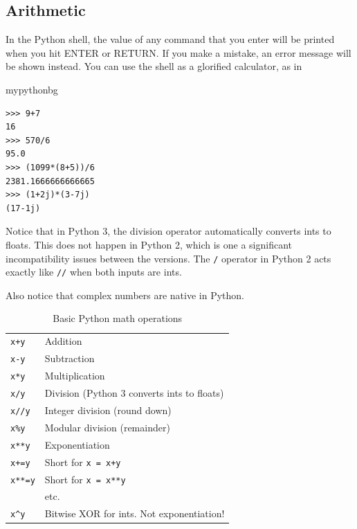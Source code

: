 \subsection{Arithmetic}

In the Python shell, the value of any command
that you enter will be printed when you hit ENTER or RETURN.
If you make a mistake, an error message will be shown instead.
You can use the shell as a glorified calculator, as in
\begin{tsession}{mypythonbg}
\begin{verbatim}
>>> 9+7
16
>>> 570/6
95.0
>>> (1099*(8+5))/6
2381.1666666666665
>>> (1+2j)*(3-7j)
(17-1j)
\end{verbatim}
\end{tsession}
Notice that in Python 3, the division operator automatically converts ints to floats.
This does not happen in Python 2,
which is one a significant incompatibility issues between the versions.
The \texttt{/} operator in Python 2 acts exactly like \texttt{//} when both inputs are ints.

Also notice that complex numbers are native in Python.

\begin{table}
\centering
\begin{tabular}{l|l}
\texttt{x+y} & Addition\\
\texttt{x-y} & Subtraction\\
\texttt{x*y} & Multiplication\\
\texttt{x/y} & Division (Python 3 converts ints to floats)\\
\texttt{x//y} & Integer division (round down)\\
\texttt{x\%y} & Modular division (remainder)\\
\texttt{x**y} & Exponentiation\\
\hline
\texttt{x+=y} & Short for \texttt{x = x+y}\\
\texttt{x**=y} & Short for \texttt{x = x**y}\\
&etc.\\
\hline
\texttt{x\^{}y} & Bitwise XOR for ints. Not exponentiation!
\end{tabular}
\caption{Basic Python math operations}
\label{tab0pymath}
\end{table}

